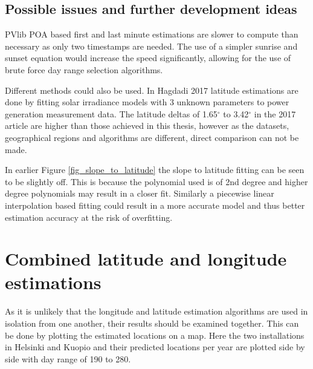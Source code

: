 \subsection{Possible issues and further development ideas}
PVlib POA based first and last minute estimations are slower to compute than necessary as only two timestamps are needed. The use of a simpler sunrise and sunset equation would increase the speed significantly, allowing for the use of brute force day range selection algorithms.

Different methods could also be used. In Hagdadi 2017 \cite{navid_australian_article} latitude estimations are done by fitting solar irradiance models with 3 unknown parameters to power generation measurement data. The latitude deltas of 1.65$^\circ$ to 3.42$^\circ$  in the 2017 article are higher than those achieved in this thesis, however as the datasets, geographical regions and algorithms are different, direct comparison can not be made.


In earlier Figure \ref{fig_slope_to_latitude} the slope to latitude fitting can be seen to be slightly off. This is because the polynomial used is of 2nd degree and higher degree polynomials may result in a closer fit. Similarly a piecewise linear interpolation based fitting could result in a more accurate model and thus better estimation accuracy at the risk of overfitting. 


\newpage
\section{Combined latitude and longitude estimations}
As it is unlikely that the longitude and latitude estimation algorithms are used in isolation from one another, their results should be examined together. This can be done by plotting the estimated locations on a map. Here the two installations in Helsinki and Kuopio and their predicted locations per year are plotted side by side with day range of 190 to 280.

